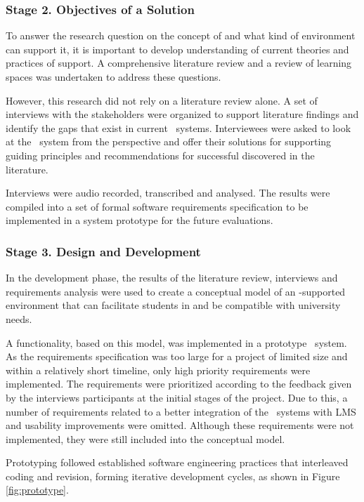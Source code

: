 \subsubsection{Stage 2. Objectives of a Solution}

To answer the research question on the concept of \LLLs and what kind of
environment can support it, it is important to develop understanding of
current theories and practices of \LLLs support. A comprehensive literature
review and a review of learning spaces was undertaken to address these
questions.

However, this research did not rely on a literature review alone. A set of
interviews with the stakeholders were organized to support literature findings
and identify the gaps that exist in current \ep~systems. Interviewees were
asked to look at the \ep~system from the \LLLs perspective and offer their
solutions for supporting guiding principles and recommendations for successful
\LLLs discovered in the literature.

Interviews were audio recorded, transcribed and analysed. The results were
compiled into a set of formal software requirements specification to be
implemented in a system prototype for the future evaluations.

\subsubsection{Stage 3. Design and Development}

In the development phase, the results of the literature review, interviews and
requirements analysis were used to create a conceptual model of an \ep-supported
environment that can facilitate students in \LLLs and be compatible with
university needs.

A functionality, based on this model, was implemented in a prototype \ep~system.
As the requirements specification was too large for a project of limited size
and within a relatively short timeline, only high priority requirements were
implemented. The requirements were prioritized according to the feedback given
by the interviews participants at the initial stages of the project. Due to
this, a number of requirements related to a better integration of the
\ep~systems with LMS and usability improvements were omitted. Although these
requirements were not implemented, they were still included into the conceptual
model.

Prototyping followed established software engineering practices that interleaved
coding and revision, forming iterative development cycles, as shown in Figure
\ref{fig:prototype}.

